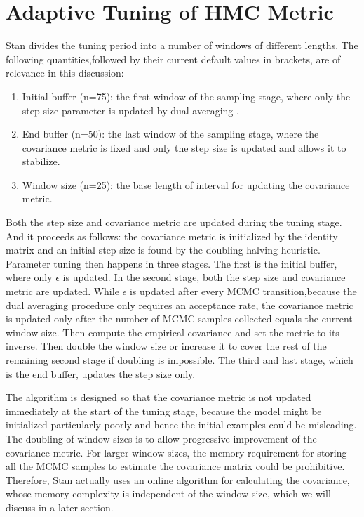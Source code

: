 \documentclass[12pt]{report}
\begin{document}
\section{Adaptive Tuning of HMC Metric}
Stan divides the tuning period into a number of windows of different lengths. The following quantities,followed by their current default values in brackets, are of relevance in this discussion: 

\begin{enumerate}
\item Initial buffer (n=75): the first window of the sampling stage, where only the step size parameter is updated by dual averaging .

\item End buffer (n=50): the last window of the sampling stage, where the covariance metric is fixed and only the step size is updated and allows it to stabilize.

\item Window size (n=25): the base length of interval for updating the covariance metric. 
\end{enumerate}

Both the step size and covariance metric are updated during the tuning stage. And it proceeds as follows: the covariance metric is initialized by the identity matrix and an initial step size is found by the doubling-halving heuristic. Parameter tuning then happens in three stages. The first is the initial buffer, where only $\epsilon $ is updated. In the second stage, both the step size and covariance metric are updated. While $\epsilon$ is updated after every MCMC transition,because the dual averaging procedure only requires an acceptance rate, the covariance metric is updated only after the number of MCMC samples collected equals the current window size. Then compute the empirical covariance and set the metric to its inverse. Then double the window size or increase it to cover the rest of the remaining second stage if doubling is impossible. The third and last stage, which is the end buffer, updates the step size only. 

The algorithm is designed so that the covariance metric is not updated immediately at the start of the tuning stage, because the model might be initialized particularly poorly and hence the initial examples could be misleading. The doubling of window sizes is to allow progressive improvement of the covariance metric. For larger window sizes, the memory requirement for storing all the MCMC samples to estimate the covariance matrix could be prohibitive. Therefore, Stan actually uses an online algorithm for calculating the covariance, whose memory complexity is independent of the window size, which we will discuss in a later section.
\end{document}
